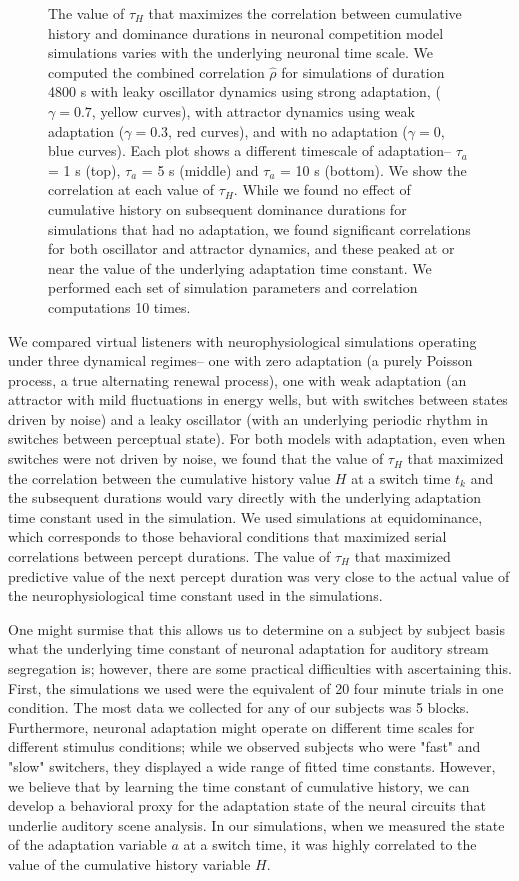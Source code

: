 \begin{figure}
	\caption{The value of $\tau_H$ that maximizes the correlation between cumulative history and dominance durations in neuronal competition model simulations varies with the underlying neuronal time scale. We computed the combined correlation $\hat{\rho}$ for simulations of duration 4800 s with leaky oscillator dynamics using strong adaptation, ($\gamma = 0.7$, yellow curves), with attractor dynamics using weak adaptation ($\gamma = 0.3$, red curves), and with no adaptation ($\gamma = 0$, blue curves). Each plot shows a different timescale of adaptation-- $\tau_a$ = 1 s (top), $\tau_a$ = 5 s (middle) and $\tau_a$ = 10 s (bottom). We show the correlation at each value of $\tau_H$. While we found no effect of cumulative history on subsequent dominance durations for simulations that had no adaptation, we found significant correlations for both oscillator and attractor dynamics, and these peaked at or near the value of the underlying adaptation time constant. We performed each set of simulation parameters and correlation computations 10 times.}
	\label{fig:rho_vs_tau_ax}
\end{figure}


We compared virtual listeners with neurophysiological simulations operating under three dynamical regimes-- one with zero adaptation (a purely Poisson process, a true alternating renewal process), one with weak adaptation (an attractor with mild fluctuations in energy wells, but with switches between states driven by noise) and a leaky oscillator (with an underlying periodic rhythm in switches between perceptual state). For both models with adaptation, even when switches were not driven by noise, we found that the value of $\tau_H$ that maximized the correlation between the cumulative history value $H$ at a switch time $t_k$ and the subsequent durations would vary directly with the underlying adaptation time constant used in the simulation. We used simulations at equidominance, which corresponds to those behavioral conditions that maximized serial correlations between percept durations. The value of $\tau_H$ that maximized predictive value of the next percept duration was very close to the actual value of the neurophysiological time constant used in the simulations.

One might surmise that this allows us to determine on a subject by subject basis what the underlying time constant of neuronal adaptation for auditory stream segregation is; however, there are some practical difficulties with ascertaining this. First, the simulations we used were the equivalent of 20 four minute trials in one condition. The most data we collected for any of our subjects was 5 blocks. Furthermore, neuronal adaptation might operate on different time scales for different stimulus conditions; while we observed subjects who were "fast" and "slow" switchers, they displayed a wide range of fitted time constants. However, we believe that by learning the time constant of cumulative history, we can develop a behavioral proxy for the adaptation state of the neural circuits that underlie auditory scene analysis. In our simulations, when we measured the state of the adaptation variable $a$ at a switch time, it was highly correlated to the value of the cumulative history variable $H$. 

